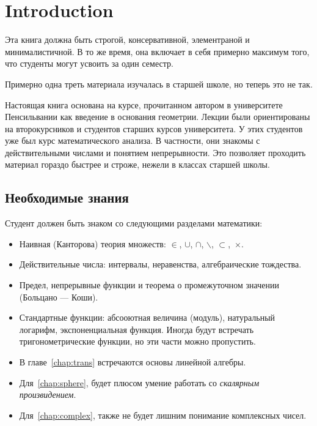 \chapter*{Introduction}

Эта книга должна быть
строгой, 
консервативной, 
элементраной и
минималистичной.
В то же время, она включает в себя примерно максимум того, что студенты могут усвоить за один семестр.

Примерно одна треть материала изучалась в старшей школе, но теперь это не так.

Настоящая книга основана 
на курсе, прочитанном автором
в университете Пенсильвании
как введение в основания геометрии.
Лекции были ориентированы на второкурсников и студентов старших курсов университета.
У этих студентов уже был курс математического анализа.
В частности, они знакомы с действительными числами и понятием непрерывности.
Это позволяет проходить материал гораздо быстрее и строже, нежели в классах старшей школы.

\section*{Необходимые знания}

Студент должен быть знаком со следующими разделами математики:
\begin{itemize}
\item Наивная (Канторова) теория множеств: 
$\in$,
$\cup$, 
$\cap$,
$\backslash$,
$\subset$,~$\times$.
\item Действительные числа: интервалы, неравенства, алгебраические тождества.
\item Предел, непрерывные функции и теорема о промежуточном значении (Больцано — Коши).
\item Стандартные функции: 
абсооютная величина (модуль), 
натуральный логарифм,
экспоненциальная функция. 
Иногда будут встречать тригонометрические функции, 
но эти части можно пропустить.
\item  В главе~\ref{chap:trans} встречаются основы линейной алгебры.
\item Для~\ref{chap:sphere}, будет плюсом умение работать со {}\emph{скалярным произвидением}.
\item Для~\ref{chap:complex}, также не будет лишним понимание комплексных чисел.
\end{itemize} 

